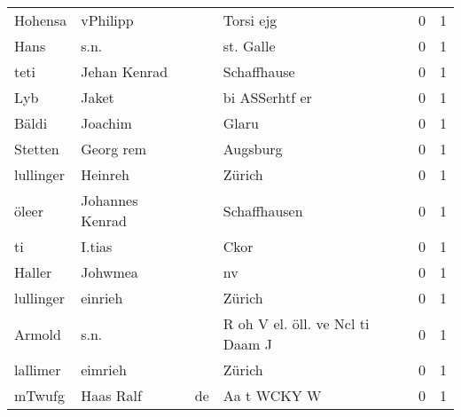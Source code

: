 \begin{center}
\begin{tiny}
\begin{longtabu}{llllrr}
                  Hohensa &                           vPhilipp &             &                                   Torsi ejg &          0 &         1 \\
                     Hans &                               s.n. &             &                                   st. Galle &          0 &         1 \\
                     teti &                       Jehan Kenrad &             &                                 Schaffhause &          0 &         1 \\
                      Lyb &                              Jaket &             &                              bi ASSerhtf er &          0 &         1 \\
                    Bäldi &                            Joachim &             &                                       Glaru &          0 &         1 \\
                  Stetten &                          Georg rem &             &                                    Augsburg &          0 &         1 \\
                lullinger &                            Heinreh &             &                                      Zürich &          0 &         1 \\
                    öleer &                    Johannes Kenrad &             &                                Schaffhausen &          0 &         1 \\
                       ti &                             I.tias &             &                                        Ckor &          0 &         1 \\
                   Haller &                            Johwmea &             &                                          nv &          0 &         1 \\
                lullinger &                            einrieh &             &                                      Zürich &          0 &         1 \\
                   Armold &                               s.n. &             &            R oh V el. öll. ve Ncl ti Daam J &          0 &         1 \\
                 lallimer &                            eimrieh &             &                                      Zürich &          0 &         1 \\
                   mTwufg &                          Haas Ralf &          de &                                 Aa t WCKY W &          0 &         1 \\

\end{longtabu}
\end{tiny}
\end{center}

